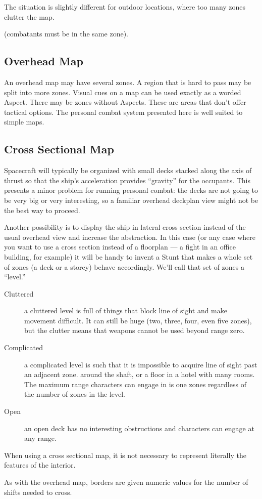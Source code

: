 The situation is slightly different for outdoor locations, where too many zones clutter the map.

 (combatants must be in the same zone).

\subsection{Overhead Map}
\label{sec:personal-combat-overhead-map}

An overhead map may have several zones. A region that is hard to pass may be split into more zones. Visual cues on a map can be used exactly as a worded Aspect. There may be zones without Aspects. These are areas that don't offer tactical options. The personal combat system presented here is well suited to simple maps.

\subsection{Cross Sectional Map}
\label{sec:personal-combat-cross-sectional-map}

Spacecraft will typically be organized with small decks stacked along the axis of thrust so that the ship's acceleration provides ``gravity'' for the occupants. This presents a minor problem for running personal combat: the decks are not going to be very big or very interesting, so a familiar overhead deckplan view might not be the best way to proceed.

Another possibility is to display the ship in lateral cross section instead of the usual overhead view and increase the abstraction. In this case (or any case where you want to use a cross section instead of a floorplan --- a fight in an office building, for example) it will be handy to invent a Stunt that makes a whole set of zones (a deck or a storey) behave accordingly. We'll call that set of zones a ``level.''

\begin{description}
\item[Cluttered]
a cluttered level is full of things that block line of sight and make movement difficult. It can still be huge (two, three, four, even five zones), but the clutter means that weapons cannot be used beyond range zero.
\item[Complicated]
a complicated level is such that it is impossible to acquire line of sight past an adjacent zone. around the shaft, or a floor in a hotel with many rooms. The maximum range characters can engage in is one zones regardless of the number of zones in the level.
\item[Open]
an open deck has no interesting obstructions and characters can engage at any range.
\end{description}

When using a cross sectional map, it is not necessary to represent literally the features of the interior.

As with the overhead map, borders are given numeric values for the number of shifts needed to cross.

